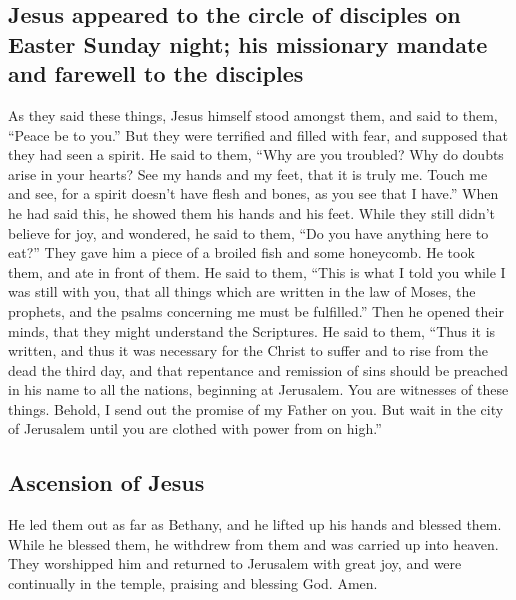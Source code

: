 \hypertarget{jesus-appeared-to-the-circle-of-disciples-on-easter-sunday-night-his-missionary-mandate-and-farewell-to-the-disciples}{%
\subsection{Jesus appeared to the circle of disciples on Easter Sunday
night; his missionary mandate and farewell to the
disciples}\label{jesus-appeared-to-the-circle-of-disciples-on-easter-sunday-night-his-missionary-mandate-and-farewell-to-the-disciples}}

 As they said these things, Jesus himself stood amongst
them, and said to them, ``Peace be to you.''  But they
were terrified and filled with fear, and supposed that they had seen a
spirit.  He said to them, ``Why are you troubled? Why do
doubts arise in your hearts?  See my hands and my feet,
that it is truly me. Touch me and see, for a spirit doesn't have flesh
and bones, as you see that I have.''  When he had said
this, he showed them his hands and his feet.  While they
still didn't believe for joy, and wondered, he said to them, ``Do you
have anything here to eat?''  They gave him a piece of a
broiled fish and some honeycomb.  He took them, and ate
in front of them.  He said to them, ``This is what I told
you while I was still with you, that all things which are written in the
law of Moses, the prophets, and the psalms concerning me must be
fulfilled.''  Then he opened their minds, that they might
understand the Scriptures.  He said to them, ``Thus it is
written, and thus it was necessary for the Christ to suffer and to rise
from the dead the third day,  and that repentance and
remission of sins should be preached in his name to all the nations,
beginning at Jerusalem.  You are witnesses of these
things.  Behold, I send out the promise of my Father on
you. But wait in the city of Jerusalem until you are clothed with power
from on high.''

\hypertarget{ascension-of-jesus}{%
\subsection{Ascension of Jesus}\label{ascension-of-jesus}}

 He led them out as far as Bethany, and he lifted up his
hands and blessed them.  While he blessed them, he
withdrew from them and was carried up into heaven.  They
worshipped him and returned to Jerusalem with great joy, 
and were continually in the temple, praising and blessing God. Amen.
